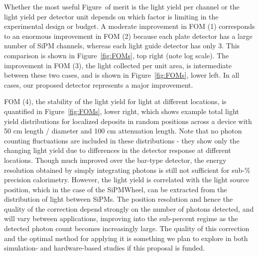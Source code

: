 Whether the most useful Figure~of merit is the light yield per channel or the light yield per detector unit depends on which factor is limiting in the experimental design or budget.  A moderate improvement in FOM (1) corresponds to an enormous improvement in FOM (2) because each plate detector has a large number of SiPM channels, whereas each light guide detector has only 3. This comparison is shown in Figure~\ref{fig:FOMs}, top right (note log scale).  The improvement in FOM (3), the light collected per unit area, is intermediate between these two cases, and is shown in Figure~\ref{fig:FOMs}, lower left.  In all cases, our proposed detector represents a major improvement.

FOM (4), the stability of the light yield for light at different locations, is quantified in Figure~\ref{fig:FOMs}, lower right, which shows example total light yield distributions for localized deposits in random positions across a device with 50 cm length / diameter and 100 cm attenuation length.   Note that no photon counting fluctuations are included in these distributions - they show only the changing light yield due to differences in the detector response at different locations.  Though much improved over the bar-type detector, the energy resolution obtained by simply integrating photons is still not sufficient for sub-\% precision calorimetry.  However, the light yield is correlated with the light source position, which in the case of the SiPMWheel, can be extracted from the distribution of light between SiPMs.  The position resolution and hence the quality of the correction depend strongly on the number of photons detected, and will vary between applications, improving into the sub-percent regime as the detected photon count becomes increasingly large.  The quality of this correction and the optimal method for applying it is something we plan to explore in both simulation- and hardware-based studies if this proposal is funded.




